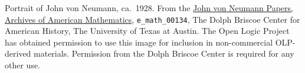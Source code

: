 Portrait of John von Neumann, ca.~1928. From the
\href{http://www.cah.utexas.edu/collections/math.php}{John von Neumann Papers, Archives of American Mathematics},
\verb|e_math_00134|, The Dolph Briscoe Center for American History, The
University of Texas at Austin. The Open Logic Project has obtained
permission to use this image for inclusion in non-commercial
OLP-derived materials.  Permission from the Dolph Briscoe Center is
required for any other use.
